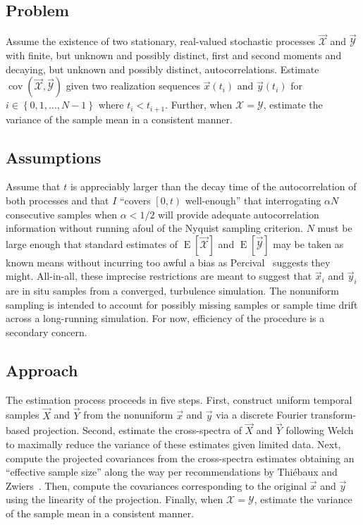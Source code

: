 \documentclass[letterpaper,11pt,nointlimits,reqno]{amsart}
\DeclareMathOperator{\cov}{cov}
\begin{document}
\subsection*{Problem}

Assume the existence of two stationary, real-valued stochastic processes
$\vec{\mathscr{X}}$ and $\vec{\mathscr{Y}}$ with finite, but unknown and
possibly distinct, first and second moments and decaying, but unknown and
possibly distinct, autocorrelations.  Estimate
$\cov\left(\vec{\mathscr{X}},\vec{\mathscr{Y}}\right)$ given two realization
sequences $\vec{x}\left(t_i\right)$ and $\vec{y}\left(t_i\right)$ for
$i\in\left\{0,1,\dots,N-1\right\}$ where $t_i < t_{i+1}$.  Further, when
$\mathscr{X}=\mathscr{Y}$, estimate the variance of the sample mean in a
consistent manner.

\subsection*{Assumptions}

Assume that $t$ is appreciably larger than the decay time of the
autocorrelation of both processes and that $I$ ``covers $\left[0,t\right)$
well-enough'' that interrogating $\alpha N$ consecutive samples when
$\alpha<1/2$ will provide adequate autocorrelation information without running
afoul of the Nyquist sampling criterion.  $N$ must be large enough that
standard estimates of $\operatorname{E}\left[\vec{\mathscr{X}}\right]$ and
$\operatorname{E}\left[\vec{\mathscr{Y}}\right]$ may be taken as known means
without incurring too awful a bias as Percival~\cite{Percival1993Three}
suggests they might.  All-in-all, these imprecise restrictions are meant to
suggest that $\vec{x}_i$ and $\vec{y}_i$ are in situ samples from a converged,
turbulence simulation.  The nonuniform sampling is intended to account for
possibly missing samples or sample time drift across a long-running simulation.
For now, efficiency of the procedure is a secondary concern.

\subsection*{Approach}

The estimation process proceeds in five steps.  First, construct uniform
temporal samples $\vec{X}$ and $\vec{Y}$ from the nonuniform $\vec{x}$ and
$\vec{y}$ via a discrete Fourier transform-based projection.  Second, estimate
the cross-spectra of $\vec{X}$ and $\vec{Y}$ following
Welch~\cite{Welch1967Use} to maximally reduce the variance of these estimates
given limited data.  Next, compute the projected covariances from the
cross-spectra estimates obtaining an ``effective sample size'' along the way
per recommendations by Thi\'{e}baux and
Zwiers~\cite{Thiebaux1984Interpretation}.  Then, compute the covariances
corresponding to the original $\vec{x}$ and $\vec{y}$ using the linearity of
the projection.  Finally, when $\mathscr{X}=\mathscr{Y}$, estimate the variance
of the sample mean in a consistent manner.
\end{document}

